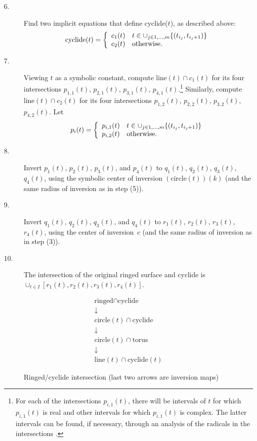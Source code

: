 \begin{description}
\item[6.]
	Find two implicit equations that define cyclide($t$), as described
	above:
\[ 
	{\rm cyclide}(t) = \left\{ \begin{array}{ll}
		c_1(t) & t \in \cup_{j \in 1,\ldots,m}\{(t_{i_j},t_{i_{j}+1})\}
				\\
		c_2(t) & {\rm otherwise}.
	\end{array} \right.
\]
\item[7.]
	Viewing $t$ as a symbolic constant,
		compute $\mbox{line}(t) \cap c_1(t)$
		for its four intersections $p_{1,1}(t)$, $p_{2,1}(t)$,
		$p_{3,1}(t)$, $p_{4,1}(t)$.\footnote{For each of the 
	intersections $p_{i,1}(t)$, there will be intervals of $t$ for which
	$p_{i,1}(t)$ is real and other intervals for which $p_{i,1}(t)$ is
	complex.  The latter intervals can be found, if necessary,
	through an analysis of the radicals in the intersections 
	\cite{Turn39}.}
		Similarly, 
		compute $\mbox{line}(t) \cap c_2(t)$
		for its four intersections $p_{1,2}(t)$, $p_{2,2}(t)$, 
		$p_{3,2}(t)$, $p_{4,2}(t)$.
		Let
\[ 
	p_i(t) = \left\{ \begin{array}{ll}
	p_{i,1}(t) & t \in \cup_{j \in 1,\dots,m}\{(t_{i_j},t_{i_{j}+1})\} 
				\\
		p_{i,2}(t) & {\rm otherwise}.
	\end{array} \right.
\]
\item[8.]
	Invert $p_1(t)$, $p_2(t)$, $p_3(t)$, and $p_4(t)$ to 
		$q_1(t)$, $q_2(t)$, $q_3(t)$, $q_4(t)$,
		using the symbolic center of inversion $(\mbox{circle}(t))(k)$
		(and the same radius of inversion as in step (5)).
\item[9.]
	Invert $q_1(t)$, $q_2(t)$, $q_3(t)$, and $q_4(t)$ to 
		$r_1(t)$, $r_2(t)$, $r_3(t)$, $r_4(t)$,
		using the center of \mbox{inversion $c$}
		(and the same radius of inversion as in step (3)).
\item[10.]
	The intersection of the original ringed surface and cyclide is
		$\cup_{t \in I} [r_1(t),r_2(t),r_3(t),r_4(t)]$.
\end{description}

\begin{figure}
\[
\begin{array}{c}
\mbox{ringed} \cap \mbox{cyclide}  \\
\downarrow \\
\mbox{circle}(t) \cap \mbox{cyclide} \\
\downarrow \\
\mbox{circle}(t) \cap \mbox{torus} \\
\downarrow \\
\mbox{line}(t) \cap \mbox{cyclide}(t)
\end{array}
\]
\caption{Ringed/cyclide intersection (last two arrows are inversion maps)}
\label{fig:box}
\end{figure}

